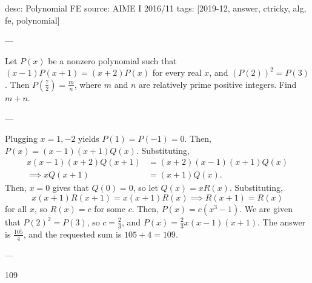 desc: Polynomial FE
source: AIME I 2016/11
tags: [2019-12, answer, ctricky, alg, fe, polynomial]

---

Let $P(x)$ be a nonzero polynomial such that $(x-1)P(x+1)=(x+2)P(x)$ for every real $x$, and $\left(P(2)\right)^2 = P(3)$. Then $P(\tfrac72)=\tfrac{m}{n}$, where $m$ and $n$ are relatively prime positive integers. Find $m + n$.

---

Plugging $x=1,-2$ yields $P(1)=P(-1)=0$. Then, $P(x)=(x-1)(x+1)Q(x)$. Substituting,
\begin{align*}
    x(x-1)(x+2)Q(x+1)&=(x+2)(x-1)(x+1)Q(x)\\
    \implies xQ(x+1)&=(x+1)Q(x).
\end{align*}
Then, $x=0$ gives that $Q(0)=0$, so let $Q(x)=xR(x)$. Substituting, \[x(x+1)R(x+1)=x(x+1)R(x)\implies R(x+1)=R(x)\]
for all $x$, so $R(x)=c$ for some $c$. Then, $P(x)=c(x^3-1)$. We are given that $P(2)^2=P(3)$, so $c=\tfrac23$, and $P(x)=\tfrac23x(x-1)(x+1)$. The answer is $\frac{105}4$, and the requested sum is $105+4=109$.

---

109
